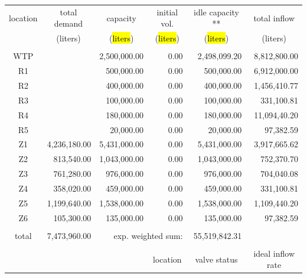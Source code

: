 \documentclass{singlecol}
\theoremstyle{TH}{
\newtheorem{lemma}{Lemma}
\newtheorem{theorem}[lemma]{Theorem}
\newtheorem{corrolary}[lemma]{Corrolary}
\newtheorem{conjecture}[lemma]{Conjecture}
\newtheorem{proposition}[lemma]{Proposition}
\newtheorem{claim}[lemma]{Claim}
\newtheorem{stheorem}[lemma]{Wrong Theorem}
\newtheorem{algorithm}{Algorithm}
}
\theoremstyle{THrm}{
\newtheorem{definition}{Definition}[section]
\newtheorem{question}{Question}[section]
\newtheorem{remark}{Remark}
\newtheorem{scheme}{Scheme}
}
\theoremstyle{THhit}{
\newtheorem{case}{Case}[section]
}
\begin{document}
\begin{table}[t]
\begin{center}
\begin{small}
	\begin{tabular}{ c r r r r r } 
		location & \multicolumn{1}{c}{total demand}      & \multicolumn{1}{c}{capacity} & \multicolumn{1}{c}{initial vol.} & \multicolumn{1}{c}{idle capacity **} & \multicolumn{1}{c}{total inflow}  \\
		      & \multicolumn{1}{c}{(liters)} & \multicolumn{1}{c}{(\hl{liters})}   & \multicolumn{1}{c}{(\hl{liters})}     &  \multicolumn{1}{c}{(\hl{liters})}   &  \multicolumn{1}{c}{(liters)}               \\
		\\
		WTP   &              & 2,500,000.00 & 0.00 &  2,498,099.20 & 8,812,800.00 \\
		R1    &              &   500,000.00 & 0.00 &    500,000.00 & 6,912,000.00 \\
		R2    &              &   400,000.00 & 0.00 &    400,000.00 & 1,456,410.77 \\
		R3    &              &   100,000.00 & 0.00 &    100,000.00 &   331,100.81 \\
	    R4    &              &   180,000.00 & 0.00 &    180,000.00 & 11,094,40.20 \\
	    R5    &              &    20,000.00 & 0.00 &     20,000.00 &    97,382.59 \\
	    Z1    & 4,236,180.00 & 5,431,000.00 & 0.00 &  5,431,000.00 & 3,917,665.62 \\
	    Z2    &   813,540.00 & 1,043,000.00 & 0.00 &  1,043,000.00 &   752,370.70 \\
	    Z3    &   761,280.00 &   976,000.00 & 0.00 &    976,000.00 &   704,040.08 \\
	    Z4    &   358,020.00 &   459,000.00 & 0.00 &    459,000.00 &   331,100.81 \\
	    Z5    & 1,199,640.00 & 1,538,000.00 & 0.00 &  1,538,000.00 & 1,109,440.20 \\
	    Z6    &   105,300.00 &   135,000.00 & 0.00 &    135,000.00 &    97,382.59 \\
	    \\
	    total & 7,473,960.00 & \multicolumn{2}{r}{exp. weighted sum:} & 55,519,842.31 &              \\
		   \\
		&  &      &  \multicolumn{1}{c}{location}    & \multicolumn{1}{c}{valve status} & \multicolumn{1}{c}{ideal inflow rate}   \\

\end{tabular}
\end{small}
\end{center}
\end{table}
\end{document}
